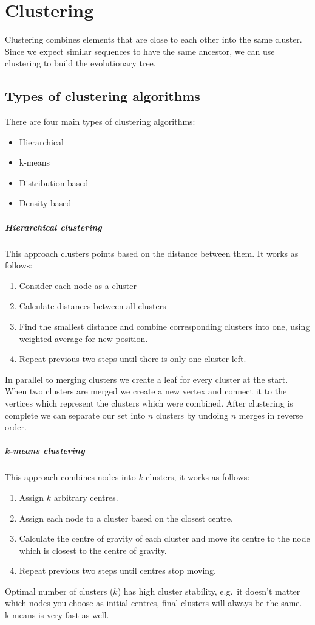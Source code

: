 \documentclass{report}
\begin{document}
\chapter{Clustering}
Clustering combines elements that are close to each other into the same cluster.
Since we expect similar sequences to have the same ancestor, we can use clustering to build the evolutionary tree.
\section{Types of clustering algorithms}
There are four main types of clustering algorithms:
\begin{itemize}
\item Hierarchical
\item k-means
\item Distribution based
\item Density based
\end{itemize}
\paragraph{Hierarchical clustering}
This approach clusters points based on the distance between them.
It works as follows:
\begin{enumerate}
\item Consider each node as a cluster
\item Calculate distances between all clusters
\item Find the smallest distance and combine corresponding clusters into one, using weighted average for new position.
\item Repeat previous two steps until there is only one cluster left.
\end{enumerate}
In parallel to merging clusters we create a leaf for every cluster at the start.
When two clusters are merged we create a new vertex and connect it to the vertices which represent the clusters which were combined.
After clustering is complete we can separate our set into $n$ clusters by undoing $n$ merges in reverse order.
\paragraph{k-means clustering}
This approach combines nodes into $k$ clusters, it works as follows:
\begin{enumerate}
\item Assign $k$ arbitrary centres.
\item Assign each node to a cluster based on the closest centre.
\item Calculate the centre of gravity of each cluster and move its centre to the node which is closest to the centre of gravity.
\item Repeat previous two steps until centres stop moving.
\end{enumerate}
Optimal number of clusters ($k$) has high cluster stability, e.g.\ it doesn't matter which nodes you choose as initial centres, final clusters will always be the same.
k-means is very fast as well.
\end{document}

